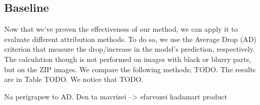 \subsection{Baseline}
\label{sec:results}

Now that we've proven the effectiveness of our method, we can apply it to evaluate different attribution methods. To do so, we use the Average Drop (AD) criterion that measure the drop/increase in the model's prediction, respectively. The calculation though is not performed on images with black or blurry parts, but on the ZIP images. We compare the following methods; TODO. The results are in Table TODO. We notice that TODO. 



Na perigrapsw to AD. Den ta mavrizei --> efarvozei hadamart product